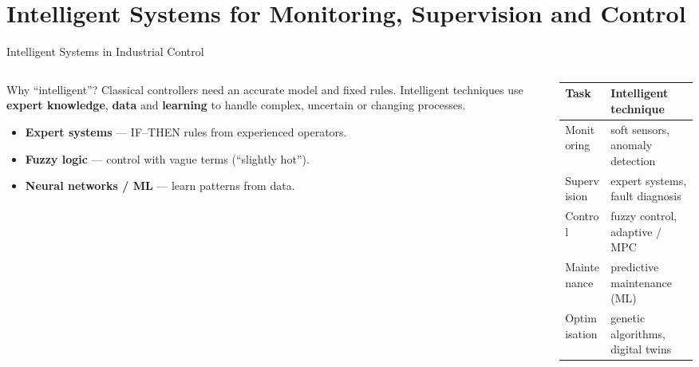 \documentclass[aspectratio=169]{beamer}
\begin{document}
	\section{Intelligent Systems for Monitoring, Supervision and Control}
	\begin{frame}{Intelligent Systems in Industrial Control}
		\begin{columns}[T]
			\begin{column}{0.5\textwidth}
				\begin{block}{Why ``intelligent''?}
					\small Classical controllers need an accurate model and fixed rules. Intelligent techniques use \textbf{expert knowledge}, \textbf{data} and \textbf{learning} to handle complex, uncertain or changing processes.
				\end{block}
				\begin{itemize}\small
					\item \textbf{Expert systems} --- IF--THEN rules from experienced operators.
					\item \textbf{Fuzzy logic} --- control with vague terms (``slightly hot'').
					\item \textbf{Neural networks / ML} --- learn patterns from data.
				\end{itemize}
			\end{column}
			\begin{column}{0.5\textwidth}
				\renewcommand{\arraystretch}{1.25}
				\centering
				\small
				\begin{tabular}{@{}>{\raggedright}p{2.1cm}>{\raggedright\arraybackslash}p{3.6cm}@{}}
					\toprule
					\textbf{Task} & \textbf{Intelligent technique} \\
					\midrule
					Monitoring   & soft sensors, anomaly detection \\
					Supervision  & expert systems, fault diagnosis \\
					Control      & fuzzy control, adaptive / MPC \\
					Maintenance  & predictive maintenance (ML) \\
					Optimisation & genetic algorithms, digital twins \\
					\bottomrule
				\end{tabular}
			\end{column}
		\end{columns}
	\end{frame}
\end{document}
